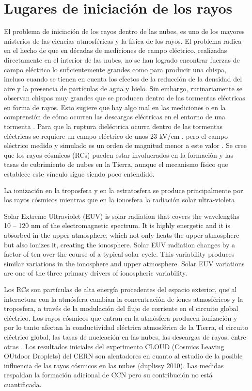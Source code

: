 \documentclass[12pt,oneside,openany,letter]{book}
\begin{document}
\section{Lugares de iniciación de los rayos}
El problema de iniciación de los rayos dentro de las nubes, es uno de los mayores misterios de las ciencias atmosféricas y la física de los rayos. El problema radica en el hecho de que en décadas de mediciones de campo eléctrico, realizadas directamente en el interior de las nubes, no se han logrado encontrar fuerzas de campo eléctrico lo suficientemente grandes como para producir una chispa, incluso cuando se tienen en cuenta los efectos de la reducción de la densidad del aire y la presencia de partículas de agua y hielo. Sin embargo, rutinariamente se observan chispas muy grandes que se producen dentro de las tormentas eléctricas en forma de rayos. Esto sugiere que hay algo mal en las mediciones o en la comprensión de cómo ocurren las descargas eléctricas en el entorno de una tormenta \cite{DwyerUman2014}. Para que la ruptura dieléctrica ocurra dentro de las tormentas eléctricas se requiere un campo eléctrico de unos 23 kV/cm \cite{GurevichEtal2009}, pero el campo eléctrico medido y simulado es un orden de magnitud menor a este valor \cite{MarshallEtal2005, DwyerEtal2006, StolzenburgEtal2007}. Se cree que los rayos cósmicos (RCs) pueden estar involucrados en la formación y las tasas de cubrimiento de nubes en la Tierra, aunque el mecanismo físico que establece este vínculo sigue siendo poco entendido. 

La ionización en la troposfera y en la estratosfera se produce principalmente por los rayos cósmicos mientras que en la ionosfera la radiación solar ultra-violeta

Solar Extreme Ultraviolet (EUV) is solar radiation that covers the wavelengths 10 – 120 nm of the electromagnetic spectrum. It is highly energetic and it is absorbed in the upper atmosphere, which not only heats the upper atmosphere but also ionizes it, creating the ionosphere. Solar EUV radiation changes by a factor of ten over the course of a typical solar cycle. This variability produces similar variations in the ionosphere and upper atmosphere. Solar EUV variations are one of the three primary drivers of ionospheric variability.

Los RCs son partículas de alta energía procedentes del espacio exterior, que al interactuar con la atmósfera cambian la concentración de iones atmosféricos y la troposfera, a través de la modulación del flujo de corriente en el circuito global eléctrico. Los rayos cósmicos que entran en la atmósfera producen ionización y por lo tanto afectan la conductividad eléctrica atmosférica de la Tierra, el circuito eléctrico global, las tasas de nucleación en las nubes, las descargas de rayos, entre otras \cite{KumarEtal2018}. Los resultados iniciales del experimento CLOUD (Cosmics Leaving OUtdoor Droplets) del CERN son alentadores en cuanto al estudio de la posible influencia de las rayos cósmicos en las nubes (duplissy 2010). Las medidas respaldan la formación adicional de CCN pero su contribución no está cuantificada. 
\end{document}
